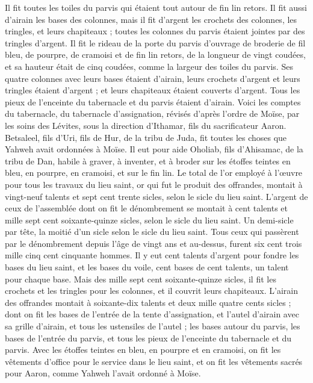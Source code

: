 \begin{multicols}{2}
Il fit toutes les toiles du parvis qui étaient tout autour de fin lin retors.
Il fit aussi d'airain les bases des colonnes, mais il fit d'argent les crochets des colonnes, les tringles, et leurs chapiteaux ; toutes les colonnes du parvis étaient jointes par des tringles d’argent.
Il fit le rideau de la porte du parvis d'ouvrage de broderie de fil bleu, de pourpre, de cramoisi et de fin lin retors, de la longueur de vingt coudées, et sa hauteur était de cinq coudées, comme la largeur des toiles du parvis.
Ses quatre colonnes avec leurs bases étaient d'airain, leurs crochets d'argent et leurs tringles étaient d’argent ; et leurs chapiteaux étaient couverts d'argent.
Tous les pieux de l’enceinte du tabernacle et du parvis étaient d'airain.
Voici les comptes du tabernacle, du tabernacle d’assignation, révisés d’après l’ordre de Moïse, par les soins des Lévites, sous la direction d’Ithamar, fils du sacrificateur Aaron.
Betsaleel, fils d'Uri, fils de Hur, de la tribu de Juda, fit toutes les choses que Yahweh avait ordonnées à Moïse.
Il eut pour aide Oholiab, fils d'Ahisamac, de la tribu de Dan, habile à graver, à inventer, et à broder sur les étoffes teintes en bleu, en pourpre, en cramoisi, et sur le fin lin.
Le total de l’or employé à l’œuvre pour tous les travaux du lieu saint, or qui fut le produit des offrandes, montait à vingt-neuf talents et sept cent trente sicles, selon le sicle du lieu saint.
L'argent de ceux de l'assemblée dont on fit le dénombrement se montait à cent talents et mille sept cent soixante-quinze sicles, selon le sicle du lieu saint.
Un demi-sicle par tête, la moitié d'un sicle selon le sicle du lieu saint. Tous ceux qui passèrent par le dénombrement depuis l'âge de vingt ans et au-dessus, furent six cent trois mille cinq cent cinquante hommes.
Il y eut cent talents d'argent pour fondre les bases du lieu saint, et les bases du voile, cent bases de cent talents, un talent pour chaque base.
Mais des mille sept cent soixante-quinze sicles, il fit les crochets et les tringles pour les colonnes, et il couvrit leurs chapiteaux.
L'airain des offrandes montait à soixante-dix talents et deux mille quatre cents sicles ;
dont on fit les bases de l’entrée de la tente d'assignation, et l'autel d'airain avec sa grille d'airain, et tous les ustensiles de l'autel ;
les bases autour du parvis, les bases de l’entrée du parvis, et tous les pieux de l’enceinte du tabernacle et du parvis. Avec les étoffes teintes en bleu, en pourpre et en cramoisi, on fit les vêtements d’office pour le service dans le lieu saint, et on fit les vêtements sacrés pour Aaron, comme Yahweh l’avait ordonné à Moïse.

\end{multicols}
